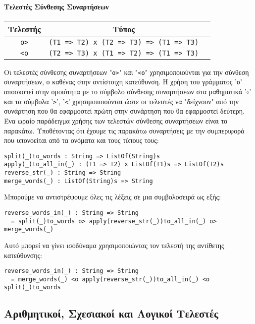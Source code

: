 \documentclass[diploma]{softlab-thesis}
\begin{document}
\newpage

\paragraph{Τελεστές Σύνθεσης Συναρτήσεων}
\begin{center}
\begin{tabular}{ |c|c|c| }
\hline
Τελεστής & Τύπος
\\
\hline
\hline
\verb|o>| & \verb|(T1 => T2) x (T2 => T3) => (T1 => T3)|
\\
\hline
\verb|<o| & \verb|(T2 => T3) x (T1 => T2) => (T1 => T3)|
\\
\hline
\end{tabular}
\end{center}
Οι τελεστές σύνθεσης συναρτήσεων "\verb|o>|" και "\verb|<o|" χρησιμοποιούνται
για την σύνθεση συναρτήσεων, ο καθένας στην αντίστοιχη κατεύθυνση. Η χρήση του
γράμματος '\verb|o|' αποσκοπεί στην ομοιότητα με το σύμβολο σύνθεσης
συναρτήσεων στα μαθηματικά '\(\circ\)' και τα σύμβολα '\verb|>|', '\verb|<|'
χρησιμοποιούνται ώστε οι τελεστές να "δείχνουν" από την συνάρτηση που θα
εφαρμοστεί πρώτη στην συνάρτηση που θα εφαρμοστεί δεύτερη. Ένα ωραίο
παράδειγμα χρήσης των τελεστών σύνθεσης συναρτήσεων είναι το παρακάτω.
Υποθέτοντας ότι έχουμε τις παρακάτω συναρτήσεις με την συμπεριφορά που
υπονοείται από τα ονόματα και τους τύπους τους:
\begin{verbatim}
split(_)to_words : String => ListOf(String)s
apply(_)to_all_in(_) : (T1 => T2) x ListOf(T1)s => ListOf(T2)s
reverse_str(_) : String => String
merge_words(_) : ListOf(String)s => String
\end{verbatim}
Μπορούμε να αντιστρέψουμε όλες τις λέξεις σε μια συμβολοσειρά ως εξής:
\begin{verbatim}
reverse_words_in(_) : String => String
  = split(_)to_words o> apply(reverse_str(_))to_all_in(_) o> merge_words(_)
\end{verbatim}
Αυτό μπορεί να γίνει ισοδύναμα χρησιμοποιώντας τον τελεστή της αντίθετης
κατεύθυνσης:
\begin{verbatim}
reverse_words_in(_) : String => String
  = merge_words(_) <o apply(reverse_str(_))to_all_in(_) <o split(_)to_words
\end{verbatim}

\newpage
\subsection{Αριθμητικοί, Σχεσιακοί και Λογικοί Τελεστές}
\end{document}
